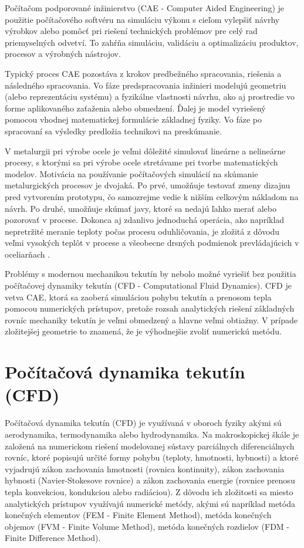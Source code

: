 \documentclass[]{tukediphc}
\begin{document}
Počítačom podporované inžinierstvo (CAE - Computer Aided Engineering) je použitie počítačového softvéru na simuláciu výkonu s cieľom vylepšiť návrhy výrobkov alebo pomôcť pri riešení technických problémov pre celý rad priemyselných odvetví. To zahŕňa simuláciu, validáciu a optimalizáciu produktov, procesov a výrobných nástrojov.

Typický proces CAE pozostáva z krokov predbežného spracovania, riešenia a následného spracovania. Vo fáze predspracovania inžinieri modelujú geometriu (alebo reprezentáciu systému) a fyzikálne vlastnosti návrhu, ako aj prostredie vo forme aplikovaného zaťaženia alebo obmedzení. Ďalej je model vyriešený pomocou vhodnej matematickej formulácie základnej fyziky. Vo fáze po spracovaní sa výsledky predložia technikovi na preskúmanie.

V metalurgii pri výrobe ocele je veľmi dôležité simulovať lineárne a nelineárne procesy, s ktorými sa pri výrobe ocele stretávame pri tvorbe matematických modelov. Motivácia na používanie počítačových simulácií na skúmanie metalurgických procesov je dvojaká. Po prvé, umožňuje testovať zmeny dizajnu pred vytvorením prototypu, čo samozrejme vedie k nižším celkovým nákladom na návrh. Po druhé, umožňuje skúmať javy, ktoré sa nedajú ľahko merať alebo pozorovať v procese. Dokonca aj zdanlivo jednoduchá operácia, ako napríklad nepretržité meranie teploty počas procesu oduhličovania, je zložitá z dôvodu veľmi vysokých teplôt v procese a všeobecne drsných podmienok prevládajúcich v oceliarňach \citep{Ersson2018}.

Problémy s modernou mechanikou tekutín by nebolo možné vyriešiť bez použitia počítačovej dynamiky tekutín (CFD - Computational Fluid Dynamics). CFD je vetva CAE, ktorá sa zaoberá simuláciou pohybu tekutín a prenosom tepla pomocou numerických prístupov, pretože rozsah analytických riešení základných rovníc mechaniky tekutín je veľmi obmedzený a hlavne veľmi obtiažny. V prípade zložitejšej geometrie to znamená, že je výhodnejšie zvoliť numerickú metódu. 

\section{Počítačová dynamika tekutín (CFD)}

Počítačová dynamika tekutín (CFD) je využívaná v oboroch fyziky akými sú aerodynamika, termodynamika alebo hydrodynamika. Na makroskopickej škále je založená na numerickom riešení modelovanej sústavy parciálnych diferenciálnych rovníc, ktoré popisujú určité formy pohybu (teploty, hmotnosti, hybnosti) a ktoré vyjadrujú zákon zachovania hmotnosti (rovnica kontinuity), zákon zachovania hybnosti (Navier-Stokesove rovnice) a zákon zachovania energie (rovnice prenosu tepla konvekciou, kondukciou alebo radiáciou). Z dôvodu ich zložitosti sa miesto analytických prístupov využívajú numerické metódy, akými sú napríklad metóda konečných elementov (FEM - Finite Element Method), metóda konečných objemov (FVM - Finite Volume Method), metóda konečných rozdielov (FDM - Finite Difference Method).
\end{document}
